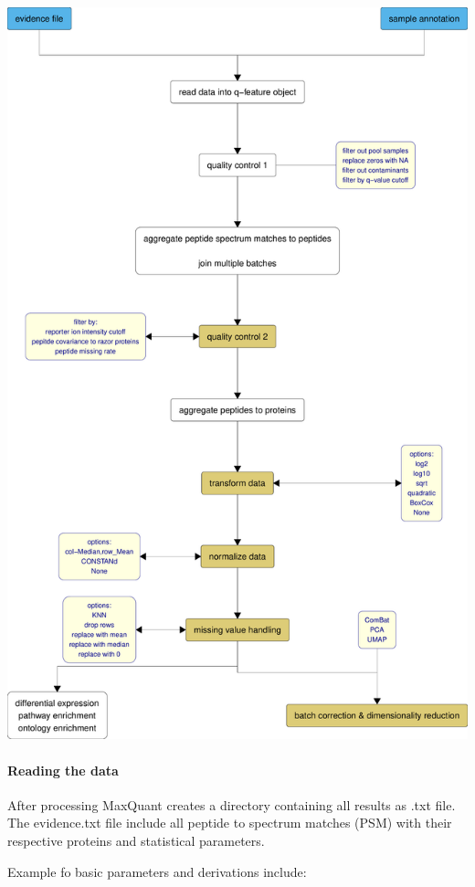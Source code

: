 \documentclass[
  11pt,
]{article}
\begin{document}
\includegraphics{Thesis_files/figure-latex/data_processing_pipeline_flowchart_vertical-1.pdf}

\hypertarget{reading-the-data}{%
\paragraph{Reading the data}\label{reading-the-data}}

After processing MaxQuant creates a directory containing all results as
.txt file. The evidence.txt file include all peptide to spectrum matches
(PSM) with their respective proteins and statistical parameters.

Example fo basic parameters and derivations include:
\end{document}
